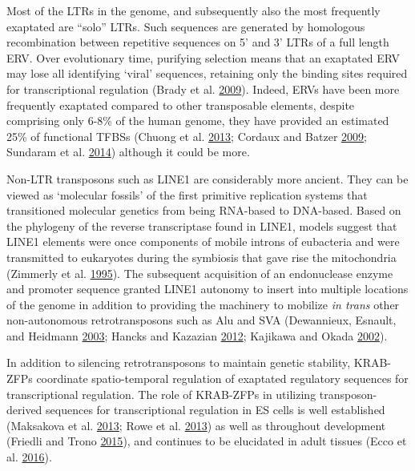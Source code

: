 \documentclass[onehalf,12pt]{beavtex}
\begin{document}
  Most of the LTRs in the genome, and subsequently also the most
  frequently exaptated are ``solo'' LTRs. Such sequences are generated by
  homologous recombination between repetitive sequences on 5' and 3' LTRs
  of a full length ERV. Over evolutionary time, purifying selection means
  that an exaptated ERV may lose all identifying `viral' sequences,
  retaining only the binding sites required for transcriptional regulation
  (Brady et al.
  \protect\hyperlink{ref-BradyIntegrationtargetsite2009}{2009}). Indeed,
  ERVs have been more frequently exaptated compared to other transposable
  elements, despite comprising only 6-8\% of the human genome, they have
  provided an estimated 25\% of functional TFBSs (Chuong et al.
  \protect\hyperlink{ref-ChuongEndogenousretrovirusesfunction2013}{2013};
  Cordaux and Batzer
  \protect\hyperlink{ref-Cordauximpactretrotransposonshuman2009}{2009};
  Sundaram et al.
  \protect\hyperlink{ref-SundaramWidespreadcontributiontransposable2014}{2014})
  although it could be more.
  
  Non-LTR transposons such as LINE1 are considerably more ancient. They
  can be viewed as `molecular fossils' of the first primitive replication
  systems that transitioned molecular genetics from being RNA-based to
  DNA-based. Based on the phylogeny of the reverse transcriptase found in
  LINE1, models suggest that LINE1 elements were once components of mobile
  introns of eubacteria and were transmitted to eukaryotes during the
  symbiosis that gave rise the mitochondria (Zimmerly et al.
  \protect\hyperlink{ref-ZimmerlyGroupIIintron1995}{1995}). The subsequent
  acquisition of an endonuclease enzyme and promoter sequence granted
  LINE1 autonomy to insert into multiple locations of the genome in
  addition to providing the machinery to mobilize \emph{in trans} other
  non-autonomous retrotransposons such as Alu and SVA (Dewannieux,
  Esnault, and Heidmann
  \protect\hyperlink{ref-DewannieuxLINEmediatedretrotranspositionmarked2003}{2003};
  Hancks and Kazazian
  \protect\hyperlink{ref-HancksActivehumanretrotransposons2012}{2012};
  Kajikawa and Okada
  \protect\hyperlink{ref-KajikawaLINEsmobilizeSINEs2002}{2002}).
  
  In addition to silencing retrotransposons to maintain genetic stability,
  KRAB-ZFPs coordinate spatio-temporal regulation of exaptated regulatory
  sequences for transcriptional regulation. The role of KRAB-ZFPs in
  utilizing transposon-derived sequences for transcriptional regulation in
  ES cells is well established (Maksakova et al.
  \protect\hyperlink{ref-MaksakovaDistinctrolesKAP12013}{2013}; Rowe et
  al. \protect\hyperlink{ref-RowenovoDNAmethylation2013}{2013}) as well as
  throughout development (Friedli and Trono
  \protect\hyperlink{ref-Friedlidevelopmentalcontroltransposable2015}{2015}),
  and continues to be elucidated in adult tissues (Ecco et al.
  \protect\hyperlink{ref-EccoTransposableElementsTheir2016}{2016}).
  
\end{document}
